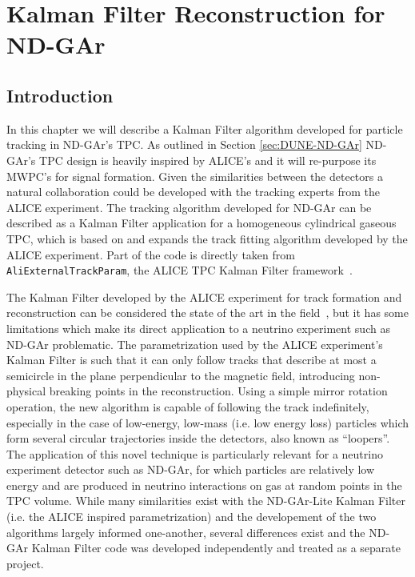 \begin{savequote}[8cm]
\end{savequote}

\chapter{\label{ch:5-KF-NDGArToy}Kalman Filter Reconstruction for ND-GAr}

\minitoc
\section{Introduction}

In this chapter we will describe a Kalman Filter algorithm developed for particle tracking in ND-GAr's TPC. As outlined in Section \ref{sec:DUNE-ND-GAr} ND-GAr's TPC design is heavily inspired by ALICE's and it will re-purpose its MWPC's for signal formation. Given the similarities between the detectors a natural collaboration could be developed with the tracking experts from the ALICE experiment. The tracking algorithm developed for ND-GAr can be described as a Kalman Filter application  for a homogeneous cylindrical gaseous TPC, which is based on and expands the track fitting algorithm developed by the ALICE experiment. Part of the code is directly taken from \texttt{AliExternalTrackParam}, the ALICE TPC Kalman Filter framework~\cite{aliroot, Belikov:1997ska, carminati2003simulation}. 

The Kalman Filter developed by the ALICE experiment for track formation and reconstruction can be considered the state of the art in the field~\cite{Ivanov:2003yr, Arslandok:2022dyb}, but it has some limitations which make its direct application to a neutrino experiment such as ND-GAr problematic. The parametrization used by the ALICE experiment's Kalman Filter is such that it can only follow tracks that describe at most a semicircle in the plane perpendicular to the magnetic field, introducing non-physical breaking points in the reconstruction. Using a simple mirror rotation operation, the new algorithm is capable of following the track indefinitely, especially in the case of low-energy, low-mass (i.e. low energy loss) particles which form several circular trajectories inside the detectors, also known as ``loopers''. The application of this novel technique is particularly relevant for a neutrino experiment detector such as ND-GAr, for which particles are relatively low energy and are produced in neutrino interactions on gas at random points in the TPC volume. While many similarities exist with the ND-GAr-Lite Kalman Filter (i.e. the ALICE inspired parametrization) and the developement of the two algorithms largely informed one-another, several differences exist and the ND-GAr Kalman Filter code was developed independently and treated as a separate project.

